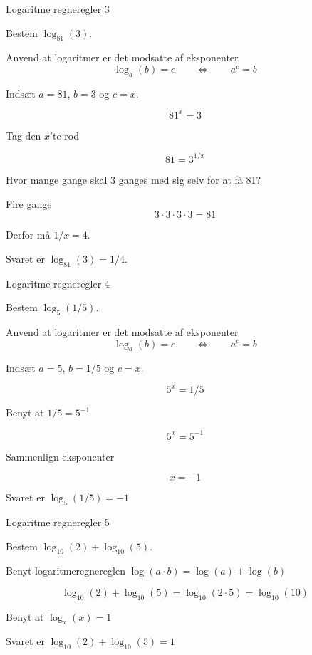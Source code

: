 \documentclass{article}
\begin{document}
\newpage
\begin{exercise}{Logaritme regneregler 3}

Bestem $\log_{81}(3)$.


\hint

Anvend at logaritmer er det modsatte af eksponenter
\[
\log_a(b) = c \qquad \Leftrightarrow \qquad a^c = b
\]

\hint

Indsæt $a=81$, $b=3$ og $c=x$.

\hint
\[
81^x = 3
\]

\hint
Tag den $x$'te rod

\hint
\[
81 = 3^{1/x}
\]

\hint
Hvor mange gange skal 3 ganges med sig selv for at få 81?

\hint
Fire gange
\[
3 \cdot 3 \cdot 3 \cdot 3 = 81
\]

\hint
Derfor må $1/x = 4$.

\hint
Svaret er $\log_{81}(3) = 1/4$.

\end{exercise}

\newpage
\begin{exercise}{Logaritme regneregler 4}

Bestem $\log_{5}(1/5)$.


\hint

Anvend at logaritmer er det modsatte af eksponenter
\[
\log_a(b) = c \qquad \Leftrightarrow \qquad a^c = b
\]

\hint

Indsæt $a=5$, $b=1/5$ og $c=x$.

\hint
\[
5^x = 1/5
\]

\hint

Benyt at $1/5 = 5^{-1}$

\hint
\[
5^x = 5^{-1}
\]

\hint

Sammenlign eksponenter

\hint
\[
x = -1
\]

\hint
Svaret er $\log_{5}(1/5) = -1$


\end{exercise}

\newpage
\begin{exercise}{Logaritme regneregler 5}

Bestem $\log_{10}(2) + \log_{10}(5)$.


\hint

Benyt logaritmeregnereglen $\log(a \cdot b) = \log(a) + \log(b)$

\hint
\[
\log_{10}(2) + \log_{10}(5) = \log_{10}(2 \cdot 5) = \log_{10}(10)
\]

\hint
Benyt at $\log_{x}(x) = 1$

\hint

Svaret er $\log_{10}(2) + \log_{10}(5) = 1$
\end{exercise}
\end{document}
